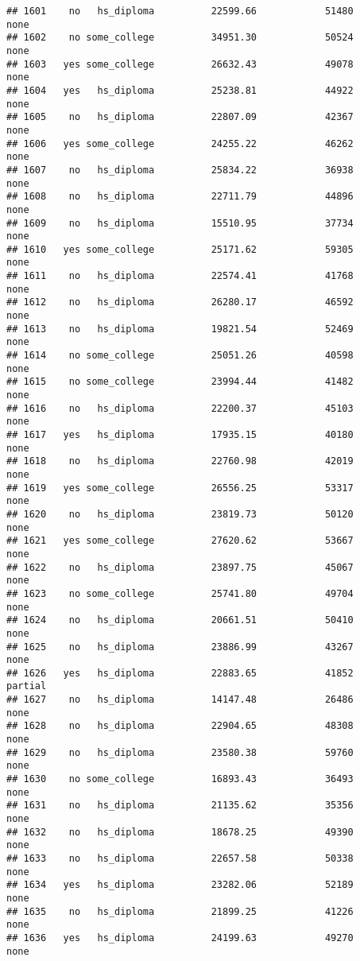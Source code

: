 \documentclass[
]{article}
\begin{document}
\begin{verbatim}
## 1601    no   hs_diploma          22599.66            51480        none
## 1602    no some_college          34951.30            50524        none
## 1603   yes some_college          26632.43            49078        none
## 1604   yes   hs_diploma          25238.81            44922        none
## 1605    no   hs_diploma          22807.09            42367        none
## 1606   yes some_college          24255.22            46262        none
## 1607    no   hs_diploma          25834.22            36938        none
## 1608    no   hs_diploma          22711.79            44896        none
## 1609    no   hs_diploma          15510.95            37734        none
## 1610   yes some_college          25171.62            59305        none
## 1611    no   hs_diploma          22574.41            41768        none
## 1612    no   hs_diploma          26280.17            46592        none
## 1613    no   hs_diploma          19821.54            52469        none
## 1614    no some_college          25051.26            40598        none
## 1615    no some_college          23994.44            41482        none
## 1616    no   hs_diploma          22200.37            45103        none
## 1617   yes   hs_diploma          17935.15            40180        none
## 1618    no   hs_diploma          22760.98            42019        none
## 1619   yes some_college          26556.25            53317        none
## 1620    no   hs_diploma          23819.73            50120        none
## 1621   yes some_college          27620.62            53667        none
## 1622    no   hs_diploma          23897.75            45067        none
## 1623    no some_college          25741.80            49704        none
## 1624    no   hs_diploma          20661.51            50410        none
## 1625    no   hs_diploma          23886.99            43267        none
## 1626   yes   hs_diploma          22883.65            41852     partial
## 1627    no   hs_diploma          14147.48            26486        none
## 1628    no   hs_diploma          22904.65            48308        none
## 1629    no   hs_diploma          23580.38            59760        none
## 1630    no some_college          16893.43            36493        none
## 1631    no   hs_diploma          21135.62            35356        none
## 1632    no   hs_diploma          18678.25            49390        none
## 1633    no   hs_diploma          22657.58            50338        none
## 1634   yes   hs_diploma          23282.06            52189        none
## 1635    no   hs_diploma          21899.25            41226        none
## 1636   yes   hs_diploma          24199.63            49270        none

\end{verbatim}
\end{document}
